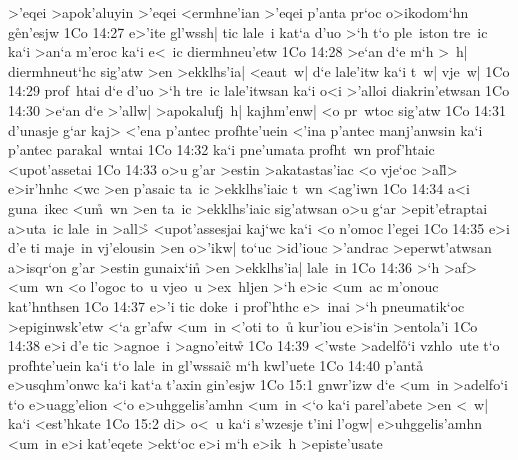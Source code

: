 >'eqei
>apok'aluyin
>'eqei
<ermhne'ian
>'eqei
p'anta
pr`oc
o>ikodom`hn
g\r{e}n'esjw\bibvsend
{}
\vs 1Co 14:27
e>'ite
gl'wssh|
tic
lale~i
kat`a
d'uo
>`h
t`o
ple~iston
tre~ic
ka`i
>an`a
m'eroc
ka`i
e<~ic
diermhneu'etw\bibvsend
\vs 1Co 14:28
>e`an
d`e
m`h
>~h|
diermhneut`hc
sig'atw
>en
>ekklhs'ia|
<eaut~w|
d`e
lale'itw
ka`i
t~w|
vje~w|\bibvsend
\vs 1Co 14:29
prof~htai
d`e
d'uo
>`h
tre~ic
lale'itwsan
ka`i
o<i
>'alloi
diakrin'etwsan\bibvsend
\vs 1Co 14:30
>e`an
d`e
>'allw|
>apokalufj~h|
kajhm'enw|
<o
pr~wtoc
sig'atw\bibvsend
\vs 1Co 14:31
d'unasje
g`ar
kaj>
<'ena
p'antec
profhte'uein
<'ina
p'antec
manj'anwsin
ka`i
p'antec
parakal~wntai\bibvsend
\vs 1Co 14:32
ka`i
pne'umata
profht~wn
prof'htaic
<upot'assetai\bibvsend
\vs 1Co 14:33
o>u
g'ar
>estin
>akatastas'iac
<o
vje`oc
>al\r{l}>
e>ir'hnhc
<wc
>en
p'asaic
ta~ic
>ekklhs'iaic
t~wn
<ag'iwn\bibvsend
\vs 1Co 14:34
a<i
guna~ikec
<u\r{m}~wn
>en
ta~ic
>ekklhs'iaic
sig'atwsan
o>u
g`ar
>epit'e\r{t}raptai
a>uta~ic
lale~in
>all>\r{}
<upot'assesjai
kaj`wc
ka`i
<o
n'omoc
l'egei\bibvsend
\vs 1Co 14:35
e>i
d'e
ti
maje~in
vj'elousin
>en
o>'ikw|
to`uc
>id'iouc
>'andrac
>eperwt'atwsan
a>isqr`on
g'ar
>estin
gunaix`in\r{}
>en
>ekklhs'ia|
lale~in\bibvsend
\vs 1Co 14:36
>`h
>af>
<um~wn
<o
l'ogoc
to~u
vjeo~u
>ex~hljen
>`h
e>ic
<um~ac
m'onouc
kat'hnthsen\bibvsend
\vs 1Co 14:37
e>'i
tic
doke~i
prof'hthc
e>~inai
>`h
pneumatik`oc
>epiginwsk'etw
<`a
gr'afw
<um~in
<'oti
to~u\r{}
kur'iou
e>is`in
>entola'i\bibvsend
\vs 1Co 14:38
e>i
d'e
tic
>agnoe~i
>agno'eit\r{w}\bibvsend
{}
\vs 1Co 14:39
<'wste
>adelf\r{o}`i
vzhlo~ute
t`o
profhte'uein
ka`i
t`o
lale~in
gl'wssaic\r{}
m`h
kwl'uete\bibvsend
\vs 1Co 14:40
p'ant\r{a}
e>usqhm'onwc
ka`i
kat`a
t'axin
gin'esjw\bibvsend
\vs 1Co 15:1
gnwr'izw
d`e
<um~in
>adelfo`i
t`o
e>uagg'elion
<`o
e>uhggelis'amhn
<um~in
<`o
ka`i
parel'abete
>en
<~w|
ka`i
<est'hkate\bibvsend
\vs 1Co 15:2
di>
o<~u
ka`i
s'wzesje
t'ini
l'ogw|
e>uhggelis'amhn
<um~in
e>i
kat'eqete
>ekt`oc
e>i
m`h
e>ik~h
>episte'usate\bibvsend
